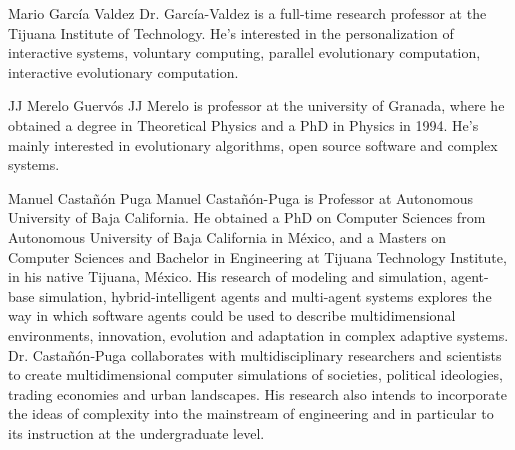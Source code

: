 \documentclass{ieeeaccess}
\begin{document}
\begin{IEEEbiography}{Mario García Valdez} 
  Dr. García-Valdez is a full-time research professor at the Tijuana
  Institute of Technology. He's interested in the personalization of
  interactive systems, voluntary computing, parallel evolutionary
  computation, interactive evolutionary computation.
\end{IEEEbiography}

\begin{IEEEbiography}{JJ Merelo Guervós} 
  JJ Merelo is professor at the university of Granada, where he obtained a
  degree in Theoretical Physics and a PhD in Physics in 1994. He's mainly
  interested in evolutionary algorithms, open source software and complex
  systems.
  
\end{IEEEbiography}

\begin{IEEEbiography}{Manuel
Castañón Puga} Manuel Castañón-Puga is Professor at Autonomous University of
Baja California. He obtained a PhD on Computer Sciences from Autonomous
University of Baja California in México, and a Masters on Computer Sciences and
Bachelor in Engineering at Tijuana Technology Institute, in his native Tijuana,
México. His research of modeling and simulation, agent-base simulation,
hybrid-intelligent agents and multi-agent systems explores the way in which
software agents could be used to describe multidimensional environments,
innovation, evolution and adaptation in complex adaptive systems. Dr.
Castañón-Puga collaborates with multidisciplinary researchers and scientists to
create multidimensional computer simulations of societies, political ideologies,
trading economies and urban landscapes. His research also intends to incorporate
the ideas of complexity into the mainstream of engineering and in particular to
its instruction at the undergraduate level. \end{IEEEbiography}
\end{document}
